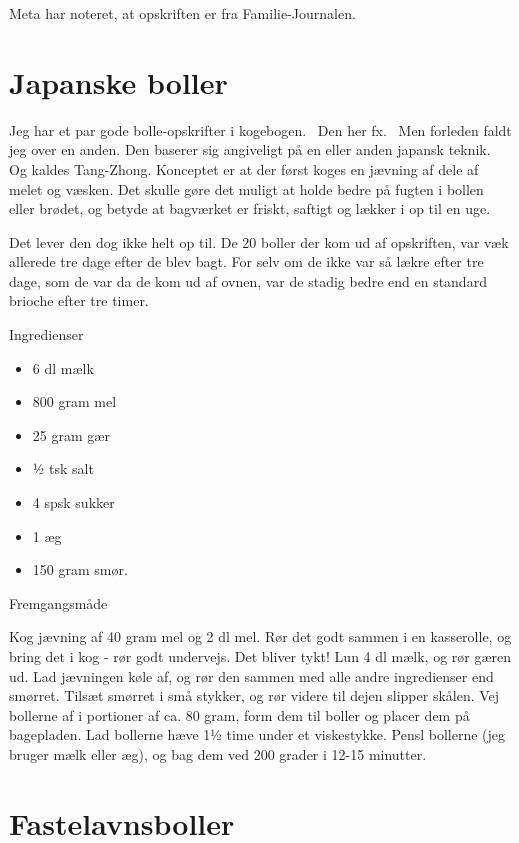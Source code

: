 \documentclass[
]{book}
\providecommand{\tightlist}{%
  \setlength{\itemsep}{0pt}\setlength{\parskip}{0pt}}
\begin{document}
Meta har noteret, at opskriften er fra Familie-Journalen.

\hypertarget{japanske-boller}{%
\section{Japanske boller}\label{japanske-boller}}

Jeg har et par gode bolle-opskrifter i kogebogen.~ Den her fx. ~Men forleden faldt jeg over en anden. Den baserer sig angiveligt på en eller anden japansk teknik. Og kaldes Tang-Zhong. Konceptet er at der først koges en jævning af dele af melet og væsken. Det skulle gøre det muligt at holde bedre på fugten i bollen eller brødet, og betyde at bagværket er friskt, saftigt og lækker i op til en uge.

Det lever den dog ikke helt op til. De 20 boller der kom ud af opskriften, var væk allerede tre dage efter de blev bagt. For selv om de ikke var så lækre efter tre dage, som de var da de kom ud af ovnen, var de stadig bedre end en standard brioche efter tre timer.

Ingredienser

\begin{itemize}
\tightlist
\item
  6 dl mælk
\item
  800 gram mel
\item
  25 gram gær
\item
  ½ tsk salt
\item
  4 spsk sukker
\item
  1 æg
\item
  150 gram smør.
\end{itemize}

Fremgangsmåde

Kog jævning af 40 gram mel og 2 dl mel. Rør det godt sammen i en kasserolle, og bring det i kog - rør godt undervejs. Det bliver tykt!
Lun 4 dl mælk, og rør gæren ud.
Lad jævningen køle af, og rør den sammen med alle andre ingredienser end smørret.
Tilsæt smørret i små stykker, og rør videre til dejen slipper skålen.
Vej bollerne af i portioner af ca. 80 gram, form dem til boller og placer dem på bagepladen.
Lad bollerne hæve 1½ time under et viskestykke.
Pensl bollerne (jeg bruger mælk eller æg), og bag dem ved 200 grader i 12-15 minutter.

\hypertarget{fastelavnsboller}{%
\section{Fastelavnsboller}\label{fastelavnsboller}}
\end{document}
